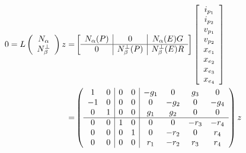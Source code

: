 \begin{equation}\label{K4Equation}
\begin{split}
  0=L\left(\begin{array}{cc} {\ensuremath{N_{\alpha}}} \\ {N_{\beta}^{\perp}}  \end{array}\right)z
    =& \left[\begin{array}{c|c|c} N_{\alpha}(P)  &  0  &  N_{\alpha}(E)G \\  \hline
        0  & N_{\beta}^{\perp}(P)  &  N_{\beta}^{\perp}(E)R \end{array}\right]
    \left[ \begin{array}{c} i_{p_1} \\ i_{p_2} \\ v_{p_1} \\ v_{p_2} \\ x_{e_1} \\ x_{e_2} \\ x_{e_3} \\ x_{e_4}
      \end{array}
      \right]
    \\
    =&
\left(\begin{array}{cc|cc|cccc}
  1 & 0  & 0  & 0  & -g_{1} & 0     & g_{3}  & 0 \\
  -1 & 0  & 0  & 0  &  0    & -g_{2} & 0      & -g_{4} \\
  0  & 1 & 0  & 0  & g_{1} & g_{2} & 0      & 0 \\ \hline
  0  & 0  & 1 & 0  & 0     & 0      & -r_{3} & -r_{4} \\
  0  & 0  & 0  & 1 & 0     & -r_{2}  & 0     & r_{4} \\
  0  & 0  & 0  & 0  & r_{1} & -r_{2}  & r_{3} & r_{4}
  \end{array}\right)z
\end{split}
\end{equation}


